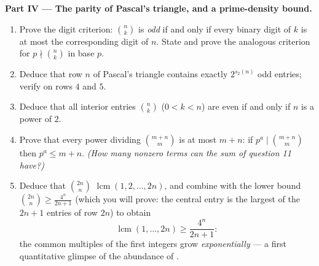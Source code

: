 \begin{problem}
\medskip
\noindent\textbf{Part IV --- The parity of Pascal's triangle, and
a prime-density bound.}
\begin{enumerate}[resume]
  \item Prove the digit criterion: $\binom nk$ is \emph{odd} if
        and only if every binary digit of $k$ is at most the
        corresponding digit of $n$. State and prove the analogous
        criterion for $p \nmid \binom nk$ in base $p$.
  \item Deduce that row $n$ of Pascal's triangle contains exactly
        $2^{s_2(n)}$ odd entries; verify on rows $4$ and $5$.
  \item Deduce that all interior entries $\binom nk$ ($0 < k < n$)
        are even if and only if $n$ is a power of $2$.
  \item Prove that every  power dividing $\binom{m+n}m$ is at
        most $m + n$: if $p^a \mid \binom{m+n}m$ then $p^a \leq
        m + n$. \emph{(How many nonzero terms can the sum of
        question 11 have?)}
  \item Deduce that $\binom{2n}n$ 
        $\operatorname{lcm}(1, 2, \dots, 2n)$, and combine with
        the lower bound $\binom{2n}n \geq \frac{4^n}{2n+1}$
        (which you will prove: the central entry is the largest
        of the $2n + 1$ entries of row $2n$) to obtain
        \[
        \operatorname{lcm}(1, \dots, 2n) \geq \frac{4^n}{2n+1} :
        \]
        the common multiples of the first integers grow
        \emph{exponentially} --- a first quantitative glimpse of
        the abundance of .
\end{enumerate}


\end{problem}
